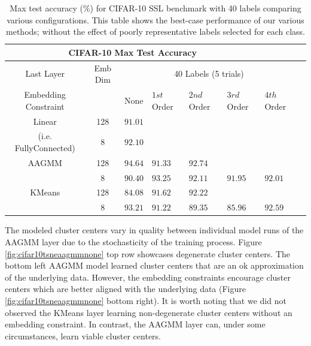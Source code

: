 \documentclass[10pt,twocolumn,letterpaper]{article}
\begin{document}
\begin{table}[ht!]
	\begin{tabularx}{\textwidth}{c|c|XXXXXX}
		\multicolumn{6}{c}{CIFAR-10 Max Test Accuracy} \\ \hline\hline
		Last Layer &   Emb Dim   & \multicolumn{5}{c}{40 Labels (5 trials)}            \\ 
		\hline
		Embedding Constraint  &  & None & $1st$ Order & $2nd$ Order & $3rd$ Order & $4th$ Order  \\ 
		\hline
		Linear & 128  & $91.01$   &  &  &  &   \\
		(i.e. FullyConnected) & 8  & $92.10$    &  &  &  &   \\
		\hline
		AAGMM  & 128  & $\boldsymbol{94.64}$    & $91.33$   & $92.74$   &  &  \\
		& 8  & $90.40$    & $93.25$   & $92.11$   & $91.95$  & $92.01$  \\
		\hline
		KMeans & 128  & $84.08$    & $91.62$   & $92.22$  &  &  \\
		& 8  & $\boldsymbol{93.21}$    & $91.22$  & $89.35$  & $85.96$  & $92.59$  \\
	\end{tabularx}
	\caption{Max test accuracy (\%) for CIFAR-10 SSL benchmark with 40 labels comparing various configurations. This table shows the best-case performance of our various methods; without the effect of poorly representative labels selected for each class. }
	\label{tablemaxcf10}
\end{table}

The modeled cluster centers vary in quality between individual model runs of the AAGMM layer due to the stochasticity of the training process.
Figure \ref{fig:cifar10tsneaagmmnone} top row showcases degenerate cluster centers.
The bottom left AAGMM model learned cluster centers that are an ok approximation of the underlying data.
However, the embedding constraints encourage cluster centers which are better aligned with the underlying data (Figure \ref{fig:cifar10tsneaagmmnone} bottom right).
It is worth noting that we did not observed the KMeans layer learning non-degenerate cluster centers without an embedding constraint.
In contrast, the AAGMM layer can, under some circumstances, learn viable cluster centers.
\end{document}
